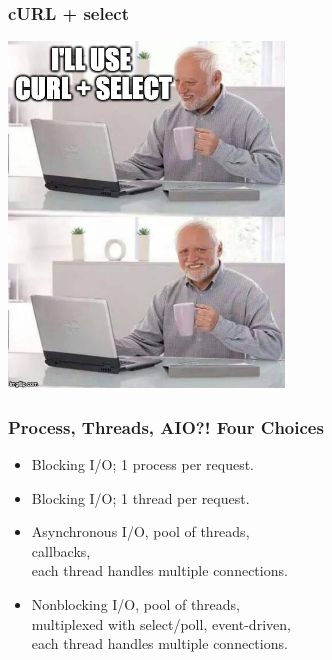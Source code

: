\begin{frame}
	\frametitle{cURL + select}
	\begin{center}
		\includegraphics[width=0.55\textwidth]{images/harold.jpg}
	\end{center}


\end{frame}


\begin{frame}
  \frametitle{Process, Threads, AIO?! Four Choices}

  
    \begin{itemize}
      \item Blocking I/O; 1 process per request.
      \item Blocking I/O; 1 thread per request.
      \item Asynchronous I/O, pool of threads, \\callbacks, \\ each thread handles multiple connections.
      \item Nonblocking I/O, pool of threads, \\ multiplexed with select/poll,
        event-driven, \\ each thread handles multiple connections.
    \end{itemize}
  

\end{frame}

